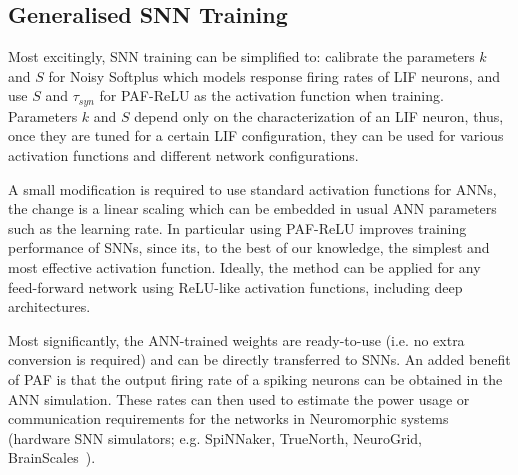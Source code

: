 \documentclass{article}
\begin{document}
%

\subsection{Generalised SNN Training}
\label{subsec:ns_train}
Most excitingly, SNN training can be simplified to: calibrate the parameters $k$ and $S$ for Noisy Softplus which models response firing rates of LIF neurons, and use $S$ and $\tau_{syn}$ for PAF-ReLU as the activation function when training.
Parameters $k$ and $S$ depend only on the characterization of an LIF neuron, thus, once they are tuned for a certain LIF configuration, they can be used for various activation functions and different network configurations.

A small modification is required to use standard activation functions for ANNs, the change is a linear scaling which can be embedded in usual ANN parameters such as the learning rate. %
In particular using PAF-ReLU improves training performance of SNNs, since its, to the best of our knowledge, the simplest and most effective activation function.
Ideally, the method can be applied for any feed-forward network using ReLU-like activation functions, including deep architectures.

Most significantly, the ANN-trained weights are ready-to-use (i.e. no extra conversion is required) and can be directly transferred to SNNs. An added benefit of PAF is that the output firing rate of a spiking neurons can be obtained in the ANN simulation. These rates can then used to estimate the power usage or communication requirements for the networks in Neuromorphic systems (hardware SNN simulators; e.g. SpiNNaker, TrueNorth, NeuroGrid, BrainScales~\cite{liu2016bench}).
\end{document}
